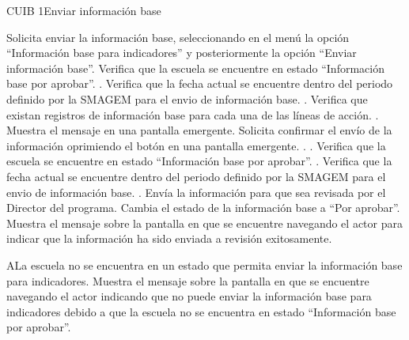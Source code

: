 \begin{UseCase}{CUIB 1}{Enviar información base}

\end{UseCase}

 \begin{UCtrayectoria}
    \UCpaso[\UCactor] Solicita enviar la información base, seleccionando en el menú  la opción ``Información base para indicadores'' y posteriormente la opción ``Enviar información base''. 
    \UCpaso[\UCsist] Verifica que la escuela se encuentre en estado ``Información base por aprobar''. .
    \UCpaso[\UCsist] Verifica que la fecha actual se encuentre dentro del periodo definido por la SMAGEM para el envio de información base. .
    \UCpaso[\UCsist] Verifica que existan registros de información base para cada una de las líneas de acción. .
    \UCpaso[\UCsist] Muestra el mensaje  en una pantalla emergente.
    \UCpaso[\UCactor] Solicita confirmar el envío de la información oprimiendo el botón  en una pantalla emergente. . .
    \UCpaso[\UCsist] Verifica que la escuela se encuentre en estado ``Información base por aprobar''. .
    \UCpaso[\UCsist] Verifica que la fecha actual se encuentre dentro del periodo definido por la SMAGEM para el envio de información base. .
    \UCpaso[\UCsist] Envía la información para que sea revisada por el Director del programa.    
    \UCpaso[\UCsist] Cambia el estado de la información base a ``Por aprobar''.
    \UCpaso[\UCsist] Muestra el mensaje  sobre la pantalla en que se encuentre navegando el actor para indicar que la información ha sido enviada a revisión exitosamente.
 \end{UCtrayectoria}
 
 \begin{UCtrayectoriaA}{A}{La escuela no se encuentra en un estado que permita enviar la información base para indicadores.}
    \UCpaso[\UCsist] Muestra el mensaje  sobre la pantalla en que se encuentre navegando el actor indicando que no puede enviar la información base para indicadores debido a que la escuela no se encuentra en estado ``Información base por aprobar''. 
 \end{UCtrayectoriaA}

